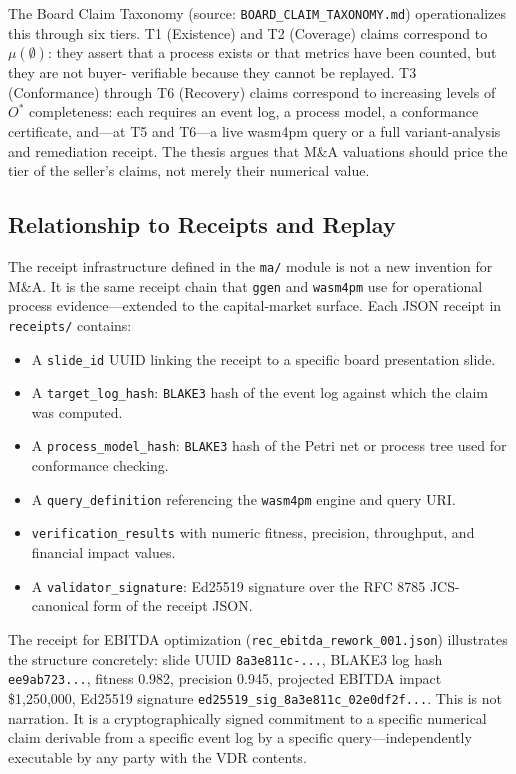 The Board Claim Taxonomy (source: \texttt{BOARD\_CLAIM\_TAXONOMY.md}) operationalizes this
through six tiers. T1 (Existence) and T2 (Coverage) claims correspond to $\mu(\emptyset)$:
they assert that a process exists or that metrics have been counted, but they are not buyer-
verifiable because they cannot be replayed. T3 (Conformance) through T6 (Recovery) claims
correspond to increasing levels of $O^*$ completeness: each requires an event log, a
process model, a conformance certificate, and---at T5 and T6---a live wasm4pm query or a
full variant-analysis and remediation receipt. The thesis argues that M\&A valuations should
price the tier of the seller's claims, not merely their numerical value.

\subsection{Relationship to Receipts and Replay}
\label{sec:ma-lineage-receipts}

The receipt infrastructure defined in the \texttt{ma/} module is not a new invention for M\&A.
It is the same receipt chain that \texttt{ggen} and \texttt{wasm4pm} use for operational
process evidence---extended to the capital-market surface. Each JSON receipt in
\texttt{receipts/} contains:

\begin{itemize}
  \item A \texttt{slide\_id} UUID linking the receipt to a specific board presentation slide.
  \item A \texttt{target\_log\_hash}: \texttt{BLAKE3} hash of the event log against which the
    claim was computed.
  \item A \texttt{process\_model\_hash}: \texttt{BLAKE3} hash of the Petri net or process tree
    used for conformance checking.
  \item A \texttt{query\_definition} referencing the \texttt{wasm4pm} engine and query URI.
  \item \texttt{verification\_results} with numeric fitness, precision, throughput, and
    financial impact values.
  \item A \texttt{validator\_signature}: Ed25519 signature over the RFC 8785 JCS-canonical
    form of the receipt JSON.
\end{itemize}

The receipt for EBITDA optimization (\texttt{rec\_ebitda\_rework\_001.json}) illustrates the
structure concretely: slide UUID \texttt{8a3e811c-...}, BLAKE3 log hash
\texttt{ee9ab723...}, fitness 0.982, precision 0.945, projected EBITDA impact \$1,250,000,
Ed25519 signature \texttt{ed25519\_sig\_8a3e811c\_02e0df2f...}. This is not narration. It is
a cryptographically signed commitment to a specific numerical claim derivable from a specific
event log by a specific query---independently executable by any party with the VDR contents.
